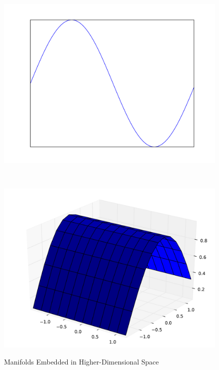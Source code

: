 \begin{figure}
	\begin{center}
		\begin{subfloat}{%
			\includegraphics[scale=0.2]{figures/1d_manifold.pdf}
		}
		\end{subfloat}~
		\begin{subfloat}{%
			\includegraphics[scale=0.225]{figures/2d_manifold.pdf}
		}
		\end{subfloat}
	\end{center}

	\caption{Manifolds Embedded in Higher-Dimensional Space}
	\label{fig:manifolds}
\end{figure}

